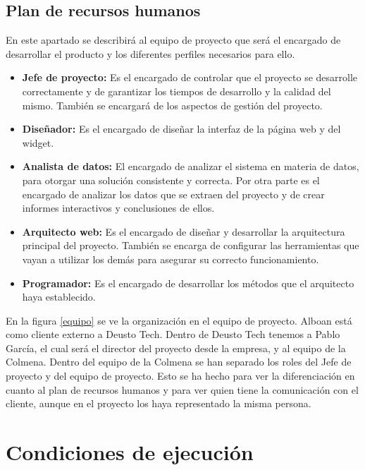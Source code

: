\subsection{Plan de recursos humanos}
En este apartado se describirá al equipo de proyecto que será el encargado de desarrollar el producto y los diferentes perfiles necesarios para ello.

\begin{itemize}
	\item \textbf{Jefe de proyecto:} Es el encargado de controlar que el proyecto se desarrolle correctamente y de garantizar los tiempos de desarrollo y la calidad del mismo. También se encargará de los aspectos de gestión del proyecto.
	\item \textbf{Diseñador:} Es el encargado de diseñar la interfaz de la página web y del widget.
	\item \textbf{Analista de datos:} El encargado de analizar el sistema en materia de datos, para otorgar una solución consistente y correcta. Por otra parte es el encargado de analizar los datos que se extraen del proyecto y de crear informes interactivos y conclusiones de ellos.
	\item \textbf{Arquitecto web:} Es el encargado de diseñar y desarrollar la arquitectura principal del proyecto. También se encarga de configurar las herramientas que vayan a utilizar los demás para asegurar su correcto funcionamiento.
	\item \textbf{Programador:} Es el encargado de desarrollar los métodos que el arquitecto haya establecido.
\end{itemize}

En la figura \ref{equipo} se ve la organización en el equipo de proyecto. Alboan está como cliente externo a Deusto Tech. Dentro de Deusto Tech tenemos a Pablo García, el cual será el director del proyecto desde la empresa, y al equipo de la Colmena. Dentro del equipo de la Colmena se han separado los roles del Jefe de proyecto y del equipo de proyecto. Esto se ha hecho para ver la diferenciación en cuanto al plan de recursos humanos y para ver quien tiene la comunicación con el cliente, aunque en el proyecto los haya representado la misma persona.


\section{Condiciones de ejecución}

